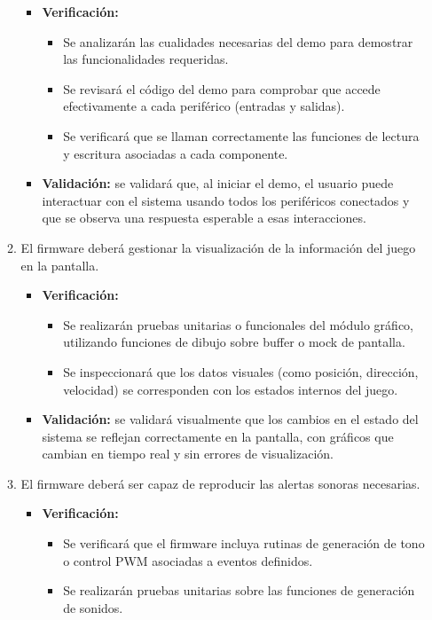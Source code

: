 \documentclass[
11pt, %
]{charter}
\begin{document}
\begin{enumerate}
\begin{enumerate}
		\begin{itemize}
			\item \textbf{Verificación:} 
			\begin{itemize}
				\item Se analizarán las cualidades necesarias del demo para demostrar las funcionalidades requeridas.
				\item Se revisará el código del demo para comprobar que accede efectivamente a cada periférico (entradas y salidas).
				\item Se verificará que se llaman correctamente las funciones de lectura y escritura asociadas a cada componente.
			\end{itemize}
			\item \textbf{Validación:} se validará que, al iniciar el demo, el usuario puede interactuar con el sistema usando todos los periféricos conectados y que se observa una respuesta esperable a esas interacciones.
		\end{itemize}		
		\item El firmware deberá gestionar la visualización de la información del juego en la pantalla. %
		\begin{itemize}
			\item \textbf{Verificación:} 
			\begin{itemize}
				\item Se realizarán pruebas unitarias o funcionales del módulo gráfico, utilizando funciones de dibujo sobre buffer o mock de pantalla.
				\item Se inspeccionará que los datos visuales (como posición, dirección, velocidad) se corresponden con los estados internos del juego.
			\end{itemize}	
			\item \textbf{Validación:} se validará visualmente que los cambios en el estado del sistema se reflejan correctamente en la pantalla, con gráficos que cambian en tiempo real y sin errores de visualización.
		\end{itemize}		
		\item El firmware deberá ser capaz de reproducir las alertas sonoras necesarias. %
		\begin{itemize}
			\item \textbf{Verificación:} 
			\begin{itemize}
				\item Se verificará que el firmware incluya rutinas de generación de tono o control PWM asociadas a eventos definidos.
				\item Se realizarán pruebas unitarias sobre las funciones de generación de sonidos.

\end{itemize}
\end{itemize}
\end{enumerate}
\end{enumerate}
\end{document}
